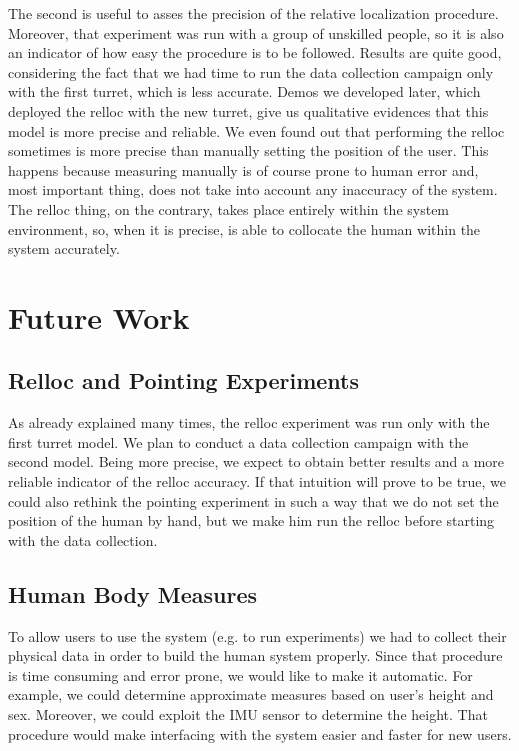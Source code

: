 The second is useful to asses the precision of the relative localization procedure. Moreover, that experiment was run with a group of unskilled people, so it is also an indicator of how easy the procedure is to be followed. Results are quite good, considering the fact that we had time to run the data collection campaign only with the first turret, which is less accurate. Demos we developed later, which deployed the \ac{relloc} with the new turret, give us qualitative evidences that this model is more precise and reliable. We even found out that performing the \ac{relloc} sometimes is more precise than manually setting the position of the user. This happens because measuring manually is of course prone to human error and, most important thing, does not take into account any inaccuracy of the system. The \ac{relloc} thing, on the contrary, takes place entirely within the system environment, so, when it is precise, is able to collocate the human within the system accurately.

\section{Future Work}
\subsection{Relloc and Pointing Experiments}
As already explained many times, the \ac{relloc} experiment was run only with the first turret model. We plan to conduct a data collection campaign with the second model. Being more precise, we expect to obtain better results and a more reliable indicator of the \ac{relloc} accuracy. If that intuition will prove to be true, we could also rethink the pointing experiment in such a way that we do not set the position of the human by hand, but we make him run the \ac{relloc} before starting with the data collection.
\subsection{Human Body Measures}
To allow users to use the system (e.g. to run experiments) we had to collect their physical data in order to build the human system properly. Since that procedure is time consuming and error prone, we would like to make it automatic. For example, we could determine approximate measures based on user's height and sex. Moreover, we could exploit the \ac{IMU} sensor to determine the height. That procedure would make interfacing with the system easier and faster for new users.

